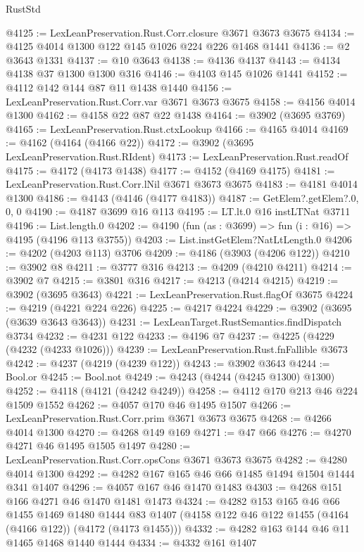 \begin{lexlean}{RustStd}
\begin{coremodule}
@4125 := LexLeanPreservation.Rust.Corr.closure @3671 @3673 @3675
@4134 := @4125 @4014 @1300 @122 @145 @1026 @224 @226 @1468 @1441
@4136 := @2 @3643 @1331
@4137 := @10 @3643
@4138 := @4136 @4137
@4143 := @4134 @4138 @37 @1300 @1300 @316
@4146 := @4103 @145 @1026 @1441
@4152 := @4112 @142 @144 @87 @11 @1438 @1440
@4156 := LexLeanPreservation.Rust.Corr.var @3671 @3673 @3675
@4158 := @4156 @4014 @1300
@4162 := @4158 @22 @87 @22 @1438
@4164 := @3902 (@3695 @3769)
@4165 := LexLeanPreservation.Rust.ctxLookup
@4166 := @4165 @4014
@4169 := @4162 (@4164 (@4166 @22))
@4172 := @3902 (@3695 LexLeanPreservation.Rust.RIdent)
@4173 := LexLeanPreservation.Rust.readOf
@4175 := @4172 (@4173 @1438)
@4177 := @4152 (@4169 @4175)
@4181 := LexLeanPreservation.Rust.Corr.lNil @3671 @3673 @3675
@4183 := @4181 @4014 @1300
@4186 := @4143 (@4146 (@4177 @4183))
@4187 := GetElem?.getElem?.{0, 0, 0}
@4190 := @4187 @3699 @16 @113
@4195 := LT.lt.{0} @16 instLTNat @3711
@4196 := List.length.{0}
@4202 := @4190 (fun (as : @3699) => fun (i : @16) => @4195 (@4196 @113 @3755))
@4203 := List.instGetElem?NatLtLength.{0}
@4206 := @4202 (@4203 @113) @3706
@4209 := @4186 (@3903 (@4206 @122))
@4210 := @3902 @8
@4211 := @3777 @316
@4213 := @4209 (@4210 @4211)
@4214 := @3902 @7
@4215 := @3801 @316
@4217 := @4213 (@4214 @4215)
@4219 := @3902 (@3695 @3643)
@4221 := LexLeanPreservation.Rust.flagOf @3675
@4224 := @4219 (@4221 @224 @226)
@4225 := @4217 @4224
@4229 := @3902 (@3695 (@3639 @3643 @3643))
@4231 := LexLeanTarget.RustSemantics.findDispatch @3734
@4232 := @4231 @122
@4233 := @4196 @7
@4237 := @4225 (@4229 (@4232 (@4233 @1026)))
@4239 := LexLeanPreservation.Rust.fnFallible @3673
@4242 := @4237 (@4219 (@4239 @122))
@4243 := @3902 @3643
@4244 := Bool.or
@4245 := Bool.not
@4249 := @4243 (@4244 (@4245 @1300) @1300)
@4252 := @4118 (@4121 (@4242 @4249))
@4258 := @4112 @170 @213 @46 @224 @1509 @1552
@4262 := @4057 @170 @46 @1495 @1507
@4266 := LexLeanPreservation.Rust.Corr.prim @3671 @3673 @3675
@4268 := @4266 @4014 @1300
@4270 := @4268 @149 @169
@4271 := @47 @66
@4276 := @4270 @4271 @46 @1495 @1505 @1497
@4280 := LexLeanPreservation.Rust.Corr.opsCons @3671 @3673 @3675
@4282 := @4280 @4014 @1300
@4292 := @4282 @167 @165 @46 @66 @1485 @1494 @1504 @1444 @341 @1407
@4296 := @4057 @167 @46 @1470 @1483
@4303 := @4268 @151 @166 @4271 @46 @1470 @1481 @1473
@4324 := @4282
    @153
    @165
    @46
    @66
    @1455
    @1469
    @1480
    @1444
    @83
    @1407
    (@4158 @122 @46 @122 @1455 (@4164 (@4166 @122)) (@4172 (@4173 @1455)))
@4332 := @4282 @163 @144 @46 @11 @1465 @1468 @1440 @1444
@4334 := @4332 @161 @1407

\end{coremodule}
\end{lexlean}
